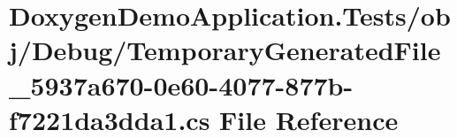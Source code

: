 \hypertarget{_tests_2obj_2_debug_2_temporary_generated_file__5937a670-0e60-4077-877b-f7221da3dda1_8cs}{}\section{Doxygen\+Demo\+Application.\+Tests/obj/\+Debug/\+Temporary\+Generated\+File\+\_\+5937a670-\/0e60-\/4077-\/877b-\/f7221da3dda1.cs File Reference}
\label{_tests_2obj_2_debug_2_temporary_generated_file__5937a670-0e60-4077-877b-f7221da3dda1_8cs}
